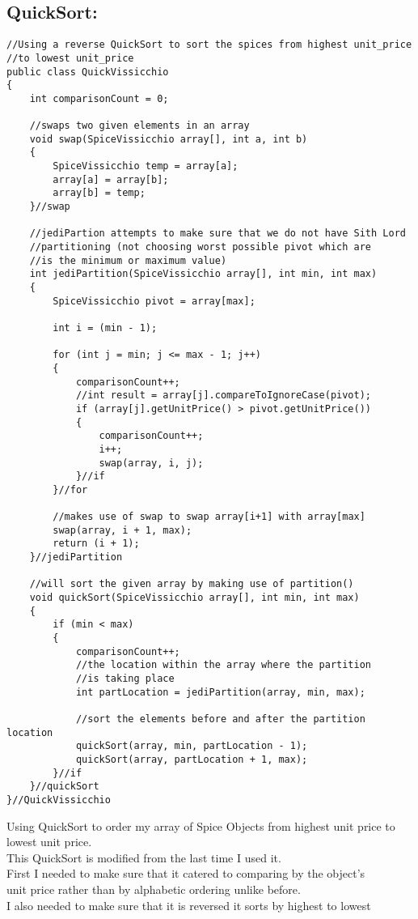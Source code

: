 \documentclass[letterpaper, 10pt]{article}
\begin{document}
\subsection{QuickSort:}
\begin{lstlisting}
//Using a reverse QuickSort to sort the spices from highest unit_price 
//to lowest unit_price
public class QuickVissicchio 
{
    int comparisonCount = 0;

    //swaps two given elements in an array
    void swap(SpiceVissicchio array[], int a, int b)
    {
        SpiceVissicchio temp = array[a];
        array[a] = array[b];
        array[b] = temp;
    }//swap

    //jediPartion attempts to make sure that we do not have Sith Lord
    //partitioning (not choosing worst possible pivot which are
    //is the minimum or maximum value)
    int jediPartition(SpiceVissicchio array[], int min, int max)
    {
        SpiceVissicchio pivot = array[max];

        int i = (min - 1);

        for (int j = min; j <= max - 1; j++)
        {
            comparisonCount++;
            //int result = array[j].compareToIgnoreCase(pivot);
            if (array[j].getUnitPrice() > pivot.getUnitPrice())
            {
                comparisonCount++;
                i++;
                swap(array, i, j);
            }//if
        }//for

        //makes use of swap to swap array[i+1] with array[max]
        swap(array, i + 1, max);
        return (i + 1);
    }//jediPartition

    //will sort the given array by making use of partition()
    void quickSort(SpiceVissicchio array[], int min, int max)
    {
        if (min < max)
        {
            comparisonCount++;
            //the location within the array where the partition 
            //is taking place
            int partLocation = jediPartition(array, min, max);

            //sort the elements before and after the partition location
            quickSort(array, min, partLocation - 1);
            quickSort(array, partLocation + 1, max);
        }//if
    }//quickSort
}//QuickVissicchio
\end{lstlisting}
\noindent
Using QuickSort to order my array of Spice Objects from highest unit price to \\
lowest unit price.\\
This QuickSort is modified from the last time I used it.\\
First I needed to make sure that it catered to comparing by the object's\\
unit price rather than by alphabetic ordering unlike before. \\
I also needed to make sure that it is reversed it sorts by highest to lowest\\
\end{document}
